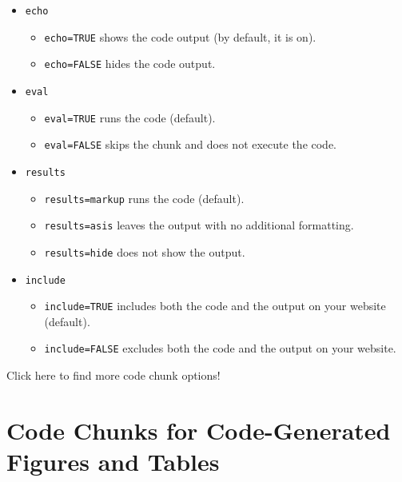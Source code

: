\documentclass[
]{book}
\providecommand{\tightlist}{%
  \setlength{\itemsep}{0pt}\setlength{\parskip}{0pt}}
\theoremstyle{definition}
\theoremstyle{definition}
\theoremstyle{definition}
\theoremstyle{definition}
\theoremstyle{remark}
\begin{document}
\begin{itemize}
\tightlist
\item
  \texttt{echo}

  \begin{itemize}
  \tightlist
  \item
    \texttt{echo=TRUE} shows the code output (by default, it is on).
  \item
    \texttt{echo=FALSE} hides the code output.
  \end{itemize}
\item
  \texttt{eval}

  \begin{itemize}
  \tightlist
  \item
    \texttt{eval=TRUE} runs the code (default).
  \item
    \texttt{eval=FALSE} skips the chunk and does not execute the code.
  \end{itemize}
\item
  \texttt{results}

  \begin{itemize}
  \tightlist
  \item
    \texttt{results=\textquotesingle{}markup\textquotesingle{}} runs the code (default).
  \item
    \texttt{results=\textquotesingle{}asis\textquotesingle{}} leaves the output with no additional formatting.
  \item
    \texttt{results=\textquotesingle{}hide\textquotesingle{}} does not show the output.
  \end{itemize}
\item
  \texttt{include}

  \begin{itemize}
  \tightlist
  \item
    \texttt{include=TRUE} includes both the code and the output on your website (default).
  \item
    \texttt{include=FALSE} excludes both the code and the output on your website.
  \end{itemize}
\end{itemize}

Click here to find more code chunk options!

\section{Code Chunks for Code-Generated Figures and Tables}\label{code-chunks-for-code-generated-figures-and-tables}
\end{document}
